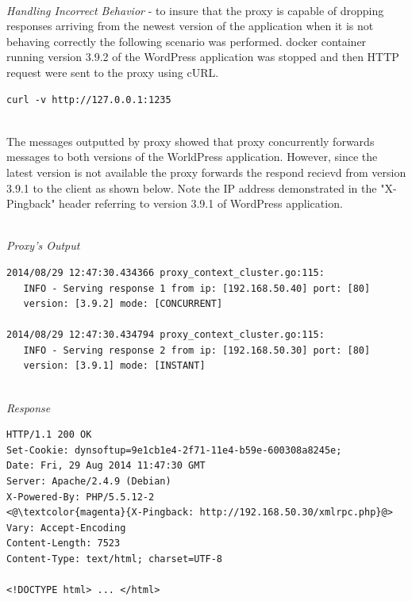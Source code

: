 \documentclass[a4paper,11pt,twoside]{report}
\begin{document}
\noindent\\
\textit{Handling Incorrect Behavior} - to insure that the proxy is capable of dropping responses arriving from the newest version of the application when it is not behaving correctly the following scenario was performed. docker container running version 3.9.2 of the WordPress application was stopped and then HTTP request were sent to the proxy using cURL.

\begin{lstlisting}[language=terminal]
curl -v http://127.0.0.1:1235
\end{lstlisting}

\noindent\\
The messages outputted by proxy showed that proxy concurrently forwards messages to both versions of the WorldPress application. However, since the latest version is not available the proxy forwards the respond recievd from version 3.9.1 to the client as shown below. Note the IP address demonstrated in the "X-Pingback" header referring to version 3.9.1 of WordPress application.    

\noindent\\
\textit{Proxy's Output}
\begin{lstlisting}[language=terminal]
2014/08/29 12:47:30.434366 proxy_context_cluster.go:115:     
   INFO - Serving response 1 from ip: [192.168.50.40] port: [80] 
   version: [3.9.2] mode: [CONCURRENT]
   
2014/08/29 12:47:30.434794 proxy_context_cluster.go:115:     
   INFO - Serving response 2 from ip: [192.168.50.30] port: [80] 
   version: [3.9.1] mode: [INSTANT]
\end{lstlisting}


\noindent\\
\textit{Response}
\begin{lstlisting}[language=terminal] 
HTTP/1.1 200 OK
Set-Cookie: dynsoftup=9e1cb1e4-2f71-11e4-b59e-600308a8245e;
Date: Fri, 29 Aug 2014 11:47:30 GMT
Server: Apache/2.4.9 (Debian)
X-Powered-By: PHP/5.5.12-2
<@\textcolor{magenta}{X-Pingback: http://192.168.50.30/xmlrpc.php}@>
Vary: Accept-Encoding
Content-Length: 7523
Content-Type: text/html; charset=UTF-8

<!DOCTYPE html> ... </html>
\end{lstlisting}
 







   
\end{document}
